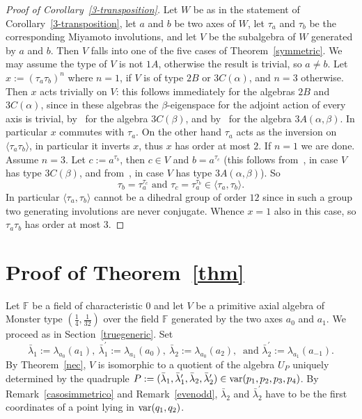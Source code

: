 \documentclass[a4paper]{amsart}
\newcommand{\Var}{{\rm var}}
\newcommand{\F}{{\mathbb F}}
\newcommand{\al}{\alpha}
\newcommand{\bt}{\beta}
\begin{document}
\begin{proof}[Proof of Corollary~\ref{3-transposition}]
Let $W$ be as in the statement of Corollary~\ref{3-transposition}, let $a$ and $b$ be two axes of $W$, let $\tau_a$ and $\tau_b$ be the corresponding Miyamoto involutions, and let $V$ be the subalgebra of $W$ generated by $a$ and $b$. Then $V$ falls into one of the five cases of Theorem~\ref{symmetric}. We may assume the type of $V$ is not $1A$, otherwise the result is trivial, so $a\neq b$. Let $x:=(\tau_a \tau_b)^n$ where $n=1$, if $V$ is of type $2B$ or $3C(\al)$, and $n=3$ otherwise.  Then $x$ acts trivially on $V$: this follows immediately for the algebras $2B$ and $3C(\al)$, since in these algebras the $\bt$-eigenspace for the adjoint action of every axis is trivial, by~\cite[Example~(3.3)]{HRS1} for the algebra $3C(\bt)$, and  by~\cite[Lemma~8.3]{R} for the algebra $3A(\al, \bt)$. In particular $x$ commutes with $\tau_a$. On the other hand $\tau_a$ acts as the inversion on $\langle \tau_a\tau_b\rangle$, in particular it inverts $x$, thus  
$x$ has order at most $2$. 
If $n=1$ we are done. Assume $n=3$. 
Let $c:=a^{\tau_b}$, then $c\in V$ and  $b=a^{\tau_c}$ (this follows from~\cite[Example~(3.3)]{HRS1}, in case $V$ has type $3C(\bt)$, and  from~\cite[Table 9]{R}, in case $V$ has type $3A(\al, \bt)$). So 
$$\tau_b = \tau_a^{\tau_c}\mbox{ and } \tau_c=\tau_a^{\tau_b}\in \langle \tau_a, \tau_b\rangle.$$ 
In particular $\langle \tau_a, \tau_b\rangle $ cannot be  a dihedral group of order $12$ since in such a group two generating involutions are never conjugate. Whence $x=1$ also in this case, so $\tau_a\tau_b$ has order at most $3$.
\end{proof}

\section{Proof of Theorem~\ref{thm}}
Let $\F$ be a field of characteristic $0$ and let $V$ be a primitive axial algebra of Monster type $(\tfrac{1}{4}, \tfrac{1}{32})$ over the field $\F$ generated by the two axes $a_0$ and $a_1$. We proceed as in Section~\ref{truegeneric}. Set
 $$
\bar \lambda_1:=\lambda_{a_0}(a_1), \:  \bar \lambda_1^\prime:=\lambda_{a_1}(a_0), \:
 \bar \lambda_2:=\lambda_{a_0}(a_2), \:\mbox{ and } \bar \lambda_2^\prime:=\lambda_{a_1}(a_{-1}). 
 $$
By Theorem~\ref{nec}, $V$ is isomorphic to a quotient of the algebra $U_P$ uniquely determined by the quadruple $P:= (\bar \lambda_1, \bar \lambda_1^\prime, \bar \lambda_2,  \bar \lambda_2^\prime)\in \Var(p_1, p_2, p_3, p_4)$.
By Remark~\ref{casosimmetrico} and  Remark~\ref{evenodd}, $\bar \lambda_2$ and   $\bar \lambda_2^\prime$ have to be the first coordinates of a point lying in ${\Var}(q_1, q_2)$. 
\end{document}

